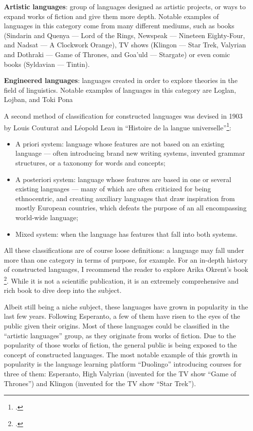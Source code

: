 \textbf{Artistic languages}: group of languages designed as artistic projects, or ways to expand works of fiction and give them more depth. Notable examples of languages
in this category come from many different mediums, such as books (Sindarin and Quenya --- Lord of the Rings, Newspeak --- Nineteen Eighty-Four, and  Nadsat --- A Clockwork Orange),
TV shows (Klingon --- Star Trek, Valyrian and Dothraki --- Game of Thrones, and Goa'uld --- Stargate) or even comic books (Syldavian --- Tintin).

\textbf{Engineered languages}: languages created in order to explore theories in the field of linguistics. Notable examples of languages in this category are Loglan, Lojban, and Toki Pona\newline

A second method of classification for constructed languages was devised in 1903 by Louis Couturat and Léopold Leau
in ``Histoire de la langue universelle''\footcite[Introduction, Pages XXVII and XXVIII]{couturat1903histoire}:

\begin{itemize}
    \setlength\itemsep{-0.5em}
    \item A priori system: language whose features are not based on an existing language --- often introducing brand new writing systems, invented grammar structures,
    or a taxonomy for words and concepts;
    \item A posteriori system: language whose features are based in one or several existing languages --- many of which are often criticized for being ethnocentric, and
    creating auxiliary languages that draw inspiration from mostly European countries, which defeats the purpose of an all encompassing world-wide language;
    \item Mixed system: when the language has features that fall into both systems.
\end{itemize}

All these classifications are of course loose definitions: a language may fall under more than one category in terms of purpose, for example. For an in-depth history of
constructed languages, I recommend the reader to explore Arika Okrent's book \footcite{okrent2009land}. While it is not a scientific publication, it is an extremely
comprehensive and rich book to dive deep into the subject.\newline

\vspace{-0.05cm}
Albeit still being a niche subject, these languages have grown in popularity in the last few years. Following Esperanto, a few of them have risen to the eyes of the public
given their origins. Most of these languages could be classified in the ``artistic languages'' group, as they originate from works of fiction. Due to the popularity of those works of
fiction, the general public is being exposed to the concept of constructed languages. The most notable example of this growth in popularity is the language learning platform
``Duolingo'' introducing courses for three of them: Esperanto, High Valyrian (invented for the TV show ``Game of Thrones'') and Klingon (invented for the TV show ``Star Trek''). \newline

